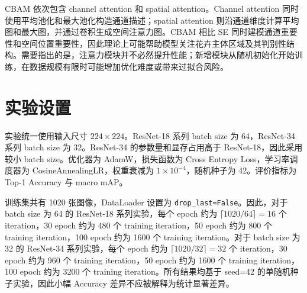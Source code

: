 \documentclass[UTF8]{ctexart}
\begin{document}
CBAM 依次包含 channel attention 和 spatial attention。Channel attention 同时使用平均池化和最大池化构造通道描述；spatial attention 则沿通道维度计算平均图和最大图，并通过卷积生成空间注意力图。CBAM 相比 SE 同时建模通道重要性和空间位置重要性，因此理论上可能帮助模型关注花卉主体区域及其判别性结构。需要指出的是，注意力模块并不必然提升性能；新增模块从随机初始化开始训练，在数据规模有限时可能增加优化难度或带来过拟合风险。

\section{实验设置}
实验统一使用输入尺寸 \(224\times224\)。ResNet-18 系列 batch size 为 64，ResNet-34 系列 batch size 为 32。ResNet-34 的参数量和显存占用高于 ResNet-18，因此采用较小 batch size。优化器为 AdamW，损失函数为 Cross Entropy Loss，学习率调度器为 CosineAnnealingLR，权重衰减为 \(1\times10^{-4}\)，随机种子为 42。评价指标为 Top-1 Accuracy 与 macro mAP。

训练集共有 1020 张图像，DataLoader 设置为 \verb|drop_last=False|。因此，对于 batch size 为 64 的 ResNet-18 系列实验，每个 epoch 约为 \(\lceil 1020/64\rceil=16\) 个 iteration，30 epoch 约为 480 个 training iteration，50 epoch 约为 800 个 training iteration，100 epoch 约为 1600 个 training iteration。对于 batch size 为 32 的 ResNet-34 系列实验，每个 epoch 约为 \(\lceil 1020/32\rceil=32\) 个 iteration，30 epoch 约为 960 个 training iteration，50 epoch 约为 1600 个 training iteration，100 epoch 约为 3200 个 training iteration。所有结果均基于 seed=42 的单随机种子实验，因此小幅 Accuracy 差异不应被解释为统计显著差异。
\end{document}
